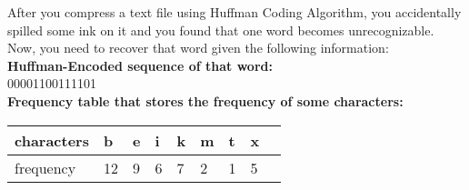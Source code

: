 
After you compress a text file using Huffman Coding Algorithm, you accidentally spilled some ink on it and you found that one word becomes unrecognizable. Now, you need to recover that word given the following information:\\

    \textbf{Huffman-Encoded sequence of that word: } \\
    00001100111101\\
    \textbf{Frequency table that stores the frequency of some characters: }\\
    \begin{table}[!hbtp]
    \centering
    \begin{tabular}{|l|l|l|l|l|l|l|l|l|}
    \hline
    characters & b & e & i & k & m & t & x \\ \hline
    frequency  & 12 & 9 & 6 & 7 & 2 & 1 & 5 \\ \hline
    \end{tabular}
    \end{table}\\\\
